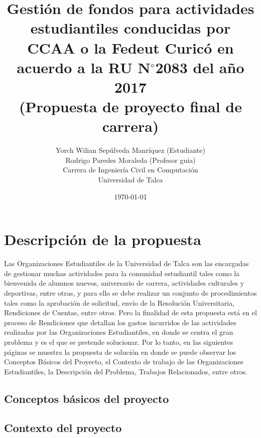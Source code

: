 \documentclass[11pt,letterpaper]{article}
\newcommand{\grad}{$^{\circ}$}
\begin{document}
\pagestyle{empty}

\title{
    Gestión de fondos para actividades estudiantiles conducidas por CCAA o la Fedeut Curicó en acuerdo a la RU N\grad 2083 del año 2017\\
    (Propuesta de proyecto final de carrera)}

\author{
Yorch Wilian Sepúlveda Manríquez (Estudiante)\\
Rodrigo Paredes Moraleda (Profesor guía)\\
Carrera de Ingeniería Civil en Computación\\ 
Universidad de Talca}

\date{\today}

\maketitle


\section{Descripción de la propuesta}

Las Organizaciones Estudiantiles de la Universidad de Talca son las encargadas de gestionar muchas actividades para la comunidad estudiantil tales como la bienvenida de alumnos nuevos, aniversario de carrera, actividades culturales y deportivas, entre otras, y para ello se debe realizar un conjunto de procedimientos tales como la aprobación de solicitud, envío de la Resolución Universitaria, Rendiciones de Cuentas, entre otros. Pero la finalidad de esta propuesta está en el proceso de Rendiciones que detallan los gastos incurridos de las actividades realizadas por las Organizaciones Estudiantiles, en donde se centra el gran problema y es el que se pretende solucionar. Por lo tanto, en las siguientes páginas se muestra la propuesta de solución en donde se puede observar los Conceptos Básicos del Proyecto, el Contexto de trabajo de las Organizaciones Estudiantiles, la Descripción del Problema, Trabajos Relacionados, entre otros.

\subsection{Conceptos básicos del proyecto} 


\subsection{Contexto del proyecto} 

\end{document}
